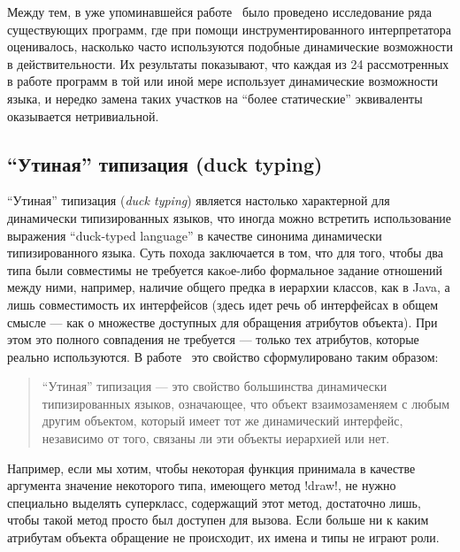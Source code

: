 Между тем, в уже упоминавшейся работе~\cite{Holkner2009} было проведено
исследование ряда существующих программ, где при помощи инструментированного
интерпретатора оценивалось, насколько часто используются подобные динамические
возможности в действительности. Их результаты показывают, что каждая из 24
рассмотренных в работе программ в той или иной мере использует динамические
возможности языка, и нередко замена таких участков на ``более статические''
эквиваленты оказывается нетривиальной. 


\subsection{``Утиная'' типизация (duck typing)}

``Утиная'' типизация (\emph{duck typing}) является настолько характерной для
динамически типизированных языков, что иногда можно встретить использование
выражения ``duck-typed language'' в качестве синонима динамически
типизированного языка. Суть похода заключается в том, что для того, чтобы два
типа были совместимы не требуется какoе-либо формальное задание отношений между
ними, например, наличие общего предка в иерархии классов, как в Java, а лишь
совместимость их интерфейсов (здесь идет речь об интерфейсах в общем смысле ---
как о множестве доступных для обращения атрибутов объекта). При этом это полного
совпадения не требуется --- только тех атрибутов, которые реально используются.
В работе~\cite{Ortin2011:union} это свойство сформулировано таким образом:

\begin{quote}
    
    ``Утиная'' типизация --- это свойство большинства динамически типизированных
    языков, означающее, что объект взаимозаменяем с любым другим объектом,
    который имеет тот же динамический интерфейс, независимо от того, связаны ли
    эти объекты иерархией или нет.
\end{quote}

Например, если мы хотим, чтобы некоторая функция принимала в качестве аргумента
значение некоторого типа, имеющего метод !draw!, не нужно специально выделять
суперкласс, содержащий этот метод, достаточно лишь, чтобы такой метод просто был
доступен для вызова. Если больше ни к каким атрибутам объекта обращение не
происходит, их имена и типы не играют роли. 

